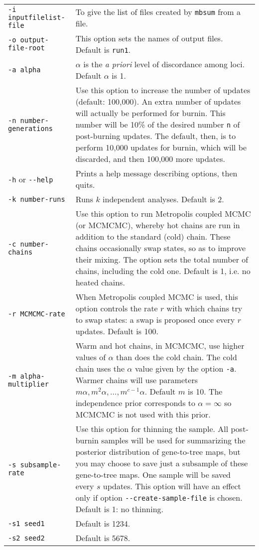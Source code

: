 \documentclass[12pt,english,final,letterpaper]{article}
\begin{document}
\noindent
\hspace*{-.2in}
\begin{tabular}{l|p{4.6in}}
{\tt -i inputfilelist-file}&To give the list of files created by {\tt mbsum} 
from a file.\\
{\tt -o output-file-root}&This option sets the names of output 
files. Default is {\tt run1}.\\
{\tt -a alpha}&$\alpha$ is the {\it a priori} level of discordance among 
loci. Default $\alpha$ is 1.\\
{\tt -n number-generations}&Use this option to increase the number of 
updates (default: 100,000). An extra number of updates will actually be 
performed for burnin. This number will be 10\% of the desired number {\tt n} 
of post-burning updates. The default, then, is to perform 10,000 updates for 
burnin, which will be discarded, and then 100,000 more updates.\\
{\tt -h} or \verb+--help+&Prints a help message describing options,
then quits.\\
{\tt -k number-runs}&Runs $k$ independent analyses. Default is 2.\\
{\tt -c number-chains}&Use this option to run Metropolis coupled MCMC (or MCMCMC), 
whereby hot chains are run in addition to the standard (cold) chain. 
These chains occasionally swap states, so as to improve their mixing. 
The option sets the total number of chains, including the cold one. 
Default is 1, i.e. no heated chains.\\
{\tt -r MCMCMC-rate}&When Metropolis coupled MCMC is used, this option
controls the rate $r$ with which chains try to swap states: a swap
is proposed once every $r$ updates. Default is 100.\\
{\tt -m alpha-multiplier}&Warm and hot chains, in MCMCMC, use higher values 
of $\alpha$ than does the cold chain. The cold chain uses the $\alpha$ value 
given by the option {\tt -a}. Warmer chains will use parameters 
$m\alpha, m^2\alpha,\dots, m^{c-1}\alpha$. Default $m$ is 10.
The independence prior corresponds to $\alpha=\infty$ so MCMCMC is not used
with this prior.\\
{\tt -s subsample-rate}&Use this option for thinning the sample. All post-burnin samples
will be used for summarizing the posterior distribution of gene-to-tree maps, 
but you may choose to save just a subsample of these gene-to-tree maps. One sample
will be saved every $s$ updates. This option will have an effect only if option
\verb+--create-sample-file+ is chosen. Default is 1: no thinning.\\
{\tt -s1 seed1}&Default is 1234. 
\\
{\tt -s2 seed2}&Default is 5678.
\end{tabular}
\end{document}
